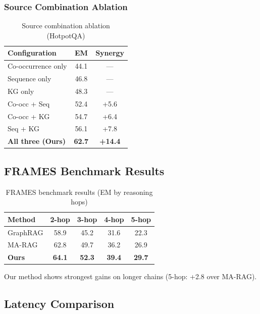 \documentclass[10pt,twocolumn]{article}
\begin{document}
\subsubsection{Source Combination Ablation}

\begin{table}[h]
\centering
\caption{Source combination ablation (HotpotQA)}
\label{tab:source_ablation}
\small
\begin{tabular}{@{}lcc@{}}
\toprule
\textbf{Configuration} & \textbf{EM} & \textbf{Synergy} \\
\midrule
Co-occurrence only & 44.1 & --- \\
Sequence only & 46.8 & --- \\
KG only & 48.3 & --- \\
\midrule
Co-occ + Seq & 52.4 & +5.6 \\
Co-occ + KG & 54.7 & +6.4 \\
Seq + KG & 56.1 & +7.8 \\
\midrule
\textbf{All three (Ours)} & \textbf{62.7} & \textbf{+14.4} \\
\bottomrule
\end{tabular}
\end{table}


\subsection{FRAMES Benchmark Results}
\label{sec:frames}

\begin{table}[h]
\centering
\caption{FRAMES benchmark results (EM by reasoning hops)}
\label{tab:frames}
\small
\begin{tabular}{@{}lcccc@{}}
\toprule
\textbf{Method} & \textbf{2-hop} & \textbf{3-hop} & \textbf{4-hop} & \textbf{5-hop} \\
\midrule
GraphRAG & 58.9 & 45.2 & 31.6 & 22.3 \\
MA-RAG & 62.8 & 49.7 & 36.2 & 26.9 \\
\midrule
\textbf{Ours} & \textbf{64.1} & \textbf{52.3} & \textbf{39.4} & \textbf{29.7} \\
\bottomrule
\end{tabular}
\end{table}

Our method shows strongest gains on longer chains (5-hop: +2.8 over MA-RAG).


\subsection{Latency Comparison}
\end{document}
